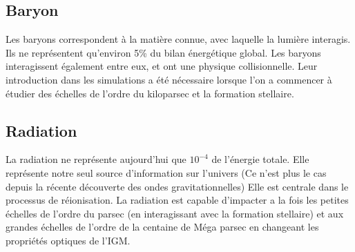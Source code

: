 %
%

\subsection{Baryon}

Les baryons correspondent à la matière connue, avec laquelle la lumière interagis.
Ils ne représentent qu'environ 5\% du bilan énergétique global.
Les baryons interagissent également entre eux, et ont une physique collisionnelle.
Leur introduction dans les simulations a été nécessaire lorsque l'on a commencer à étudier des échelles de l'ordre du kiloparsec et la formation stellaire.


\subsection{Radiation}

La radiation ne représente aujourd'hui que $10^{-4}$ de l'énergie totale.
Elle représente notre seul source d'information sur l'univers (Ce n'est plus le cas depuis la récente découverte des ondes gravitationnelles) %
Elle est centrale dans le processus de réionisation.
La radiation est capable d'impacter a la fois les petites échelles de l'ordre du parsec (en interagissant avec la formation stellaire)
et aux grandes échelles de l'ordre de la centaine de Méga parsec en changeant les propriétés optiques de l'\ac{IGM}.




%

